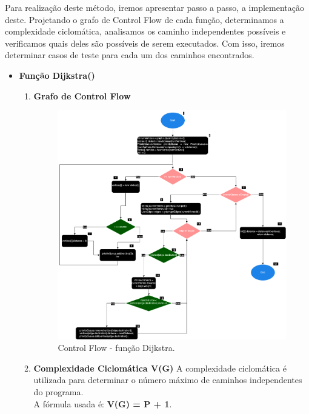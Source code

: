 \documentclass{article}
\begin{document}
Para realização deste método, iremos apresentar passo a passo, a implementação deste. Projetando o grafo de Control Flow de cada função, determinamos a complexidade ciclomática, analisamos os caminho independentes possíveis e verificamos quais deles são possíveis de serem executados. Com isso, iremos determinar casos de teste para cada um dos caminhos encontrados.
\clearpage
\begin{itemize}
    \item \textbf{Função Dijkstra()}
    
       
    \begin{enumerate}
        
        \item \textbf{Grafo de Control Flow}
    \begin{figure}[H]
    \centering
    \includegraphics[width=\textwidth]{Images/ControlFlowGraphDijkstra.png}
    \caption{Control Flow - função Dijkstra.} 
    \label{fig:ControlFlow-Dijkstra}

  \end{figure}


  \item \textbf{Complexidade Ciclomática V(G)}
  \quad A complexidade ciclomática é utilizada para determinar o número máximo de caminhos independentes do programa.\\
  \quad A fórmula usada é: \textbf{V(G) = P + 1}.\\


\end{enumerate}
\end{itemize}
\end{document}
